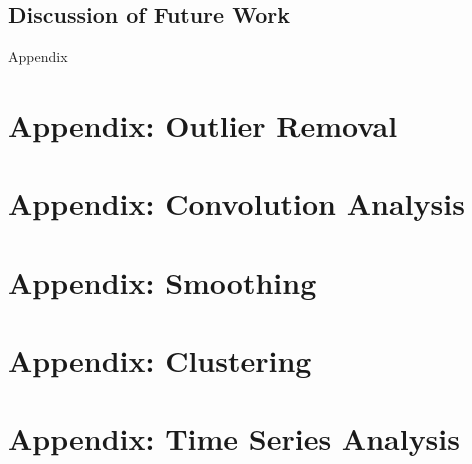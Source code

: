 \documentclass[11pt]{article}
\begin{document}
		
		
	\subsection{Discussion of Future Work}
	
		
		

\pagebreak

\begin{center}
\Huge{Appendix} \appendix
\end{center}


\section{Appendix: Outlier Removal} \label{app_outliers}



\section{Appendix: Convolution Analysis} \label{app_convolution}



\section{Appendix: Smoothing} \label{app_smoothing}



\section{Appendix: Clustering} \label{app_clustering}



\section{Appendix: Time Series Analysis} \label{app_time}




\end{document}
